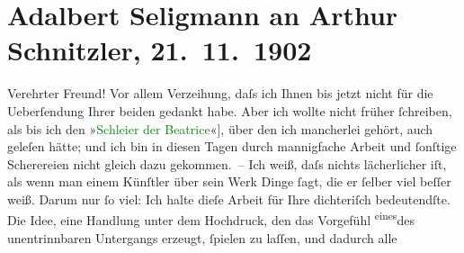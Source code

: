 

               \section[Adalbert Seligmann an Arthur Schnitzler, 21. 11. 1902]{ Adalbert Seligmann an Arthur Schnitzler, 21. 11. 1902}\nopagebreak{}\rehead{ }\normalsize\beginnumbering{} \toendnotes[C]{\smallbreak\pagebreak[2]} 
\toendnotes[C]{\smallbreak}\pstart
           \noindent{}{\pb}Verehrter Freund! Vor allem Verzeihung, daſs ich Ihnen bis jetzt
               nicht für die Ueberſendung Ihrer beiden \label{K_L01250_1v}\label{K_L01250_1h} gedankt habe. Aber
               ich wollte nicht früher ſchreiben, als bis ich den »\textcolor{green}{Schleier der Beatrice}{}\ledrightnote{\textcolor{green}{Der Schleier der Beatrice. Schauspiel in fünf Akten}}{[}«{]}, über den ich mancherlei gehört, auch geleſen hätte; und ich
               bin in diesen Tagen durch mannigfache Arbeit und ſonſtige Scherereien nicht gleich
               dazu gekommen. – Ich weiß, daſs nichts lächerlicher iſt, als wenn man einem Künſtler
               über sein {\pb}Werk Dinge ſagt, die er ſelber viel beſſer weiß. Darum nur ſo viel: Ich halte
               dieſe Arbeit für Ihre dichteriſch bedeutendſte. Die Idee, eine Handlung unter dem
               Hochdruck, den das Vorgefühl \substVorne{}\textsuperscript{eines}\substDazwischen{}des\substHinten{} unentrinnbaren Untergangs erzeugt, ſpielen zu laſſen, und dadurch alle
